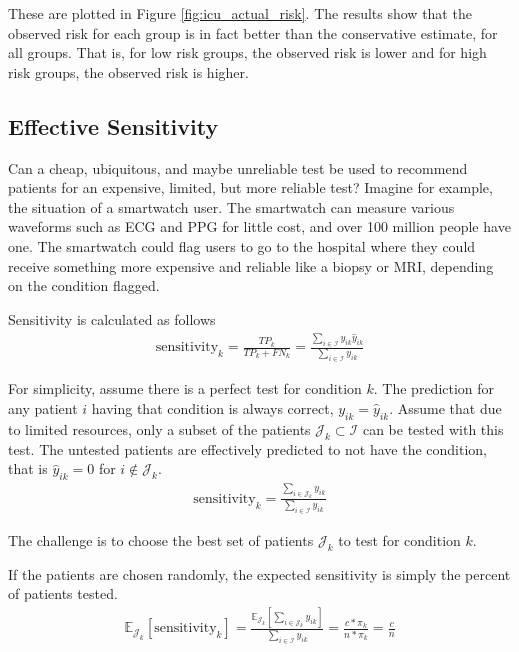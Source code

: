 These are plotted in Figure \ref{fig:icu_actual_risk}.  The results show that the observed risk for each group is in fact better than the conservative estimate, for all groups.  That is, for low risk groups, the observed risk is lower and for high risk groups, the observed risk is higher.

\subsection{Effective Sensitivity}

\figIcuCardio
\figIcuSystolic
\figIcuCerebral
\figIcuMyocard

Can a cheap, ubiquitous, and maybe unreliable test be used to recommend patients for an expensive, limited, but more reliable test?  Imagine for example, the situation of a smartwatch user.  The smartwatch can measure various waveforms such as ECG and PPG for little cost, and over 100 million people have one.  The smartwatch could flag users to go to the hospital where they could receive something more expensive and reliable like a biopsy or MRI, depending on the condition flagged.

Sensitivity is calculated as follows
\begin{gather}
    \text{sensitivity}_k 
        = \frac{TP_k}{TP_k + FN_k}
        = \frac
            {\sum_{i \in \mathcal{I}} y_{ik} \hat{y}_{ik}}
            {\sum_{i \in \mathcal{I}} y_{ik}}
\end{gather}

For simplicity, assume there is a perfect test for condition $k$.  The prediction for any patient $i$ having that condition is always correct, $y_{ik} = \hat{y}_{ik}$.  Assume that due to limited resources, only a subset of the patients $\mathcal{J}_k \subset \mathcal{I}$ can be tested with this test. The untested patients are effectively predicted to not have the condition, that is $\hat{y}_{ik} = 0$ for $i \notin \mathcal{J}_k$.
\begin{gather}
    \text{sensitivity}_k = \frac
        {\sum_{i \in \mathcal{J}_k} y_{ik}}
        {\sum_{i \in \mathcal{I}} y_{ik}}
\end{gather}

The challenge is to choose the best set of patients $\mathcal{J}_k$ to test for condition $k$.  

If the patients are chosen randomly, the expected sensitivity is simply the percent of patients tested.
\begin{gather}
    \mathbb{E}_{\mathcal{J}_k}[\text{sensitivity}_k]
        = \frac
            {\mathbb{E}_{\mathcal{J}_k}[\sum_{i \in \mathcal{J}_k} y_{ik}]}
            {\sum_{i \in \mathcal{I}} y_{ik}}
        = \frac{c * \pi_k}{n * \pi_k} 
        = \frac{c}{n}
\end{gather}

